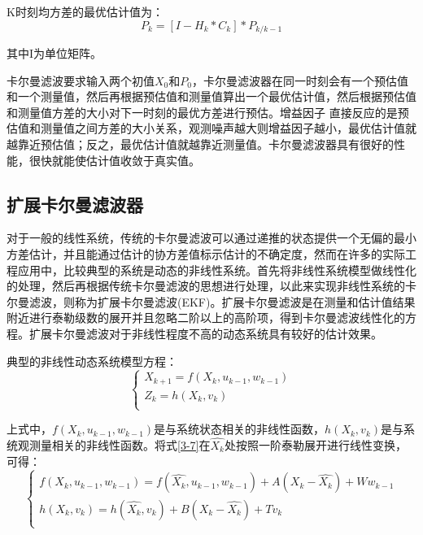 K时刻均方差的最优估计值为：
\begin{equation}
{{P}_{k}}=\left[ I-{{H}_{k}}*{{C}_{k}} \right]*{{P}_{k/k-1}}
\end{equation}

其中I为单位矩阵。

卡尔曼滤波要求输入两个初值${{X}_{0}}$和${{P}_{0}}$，卡尔曼滤波器在同一时刻会有一个预估值和一个测量值，然后再根据预估值和测量值算出一个最优估计值，然后根据预估值和测量值方差的大小对下一时刻的最优方差进行预估。增益因子 直接反应的是预估值和测量值之间方差的大小关系，观测噪声越大则增益因子越小，最优估计值就越靠近预估值；反之，最优估计值就越靠近测量值。卡尔曼滤波器具有很好的性能，很快就能使估计值收敛于真实值。

\subsection{扩展卡尔曼滤波器}
对于一般的线性系统，传统的卡尔曼滤波可以通过递推的状态提供一个无偏的最小方差估计，并且能通过估计的协方差值标示估计的不确定度，然而在许多的实际工程应用中，比较典型的系统是动态的非线性系统。首先将非线性系统模型做线性化的处理，然后再根据传统卡尔曼滤波的思想进行处理，以此来实现非线性系统的卡尔曼滤波，则称为扩展卡尔曼滤波(EKF)。扩展卡尔曼滤波是在测量和估计值结果附近进行泰勒级数的展开并且忽略二阶以上的高阶项，得到卡尔曼滤波线性化的方程。扩展卡尔曼滤波对于非线性程度不高的动态系统具有较好的估计效果。

典型的非线性动态系统模型方程：
\begin{equation}\label{3-7}
\left\{ \begin{array}{l}
   {{X}_{k+1}}=f\left( {{X}_{k}},{{u}_{k-1}},{{w}_{k-1}} \right) \\ 
  {{Z}_{k}}=h\left( {{X}_{k}},{{v}_{k}} \right) \\ 
\end{array} \right.
\end{equation}

上式中，$f\left( {{X}_{k}},{{u}_{k-1}},{{w}_{k-1}} \right)$是与系统状态相关的非线性函数，$h\left( {{X}_{k}},{{v}_{k}} \right)$是与系统观测量相关的非线性函数。将式\ref{3-7}在$\widehat{{{X}_{k}}}$处按照一阶泰勒展开进行线性变换，可得：
\begin{equation}
\left\{ \begin{array}{l}
  f\left( {{X}_{k}},{{u}_{k-1}},{{w}_{k-1}} \right)=f\left( \widehat{{{X}_{k}}},{{u}_{k-1}},{{w}_{k-1}} \right)+A\left( {{X}_{k}}-\widehat{{{X}_{k}}} \right)+W{{w}_{k-1}} \\ 
 h\left( {{X}_{k}},{{v}_{k}} \right)=h\left( \widehat{{{X}_{k}}},{{v}_{k}} \right)+B\left( {{X}_{k}}-\widehat{{{X}_{k}}} \right)+T{{v}_{k}} \\ 
\end{array} \right.
\end{equation}

